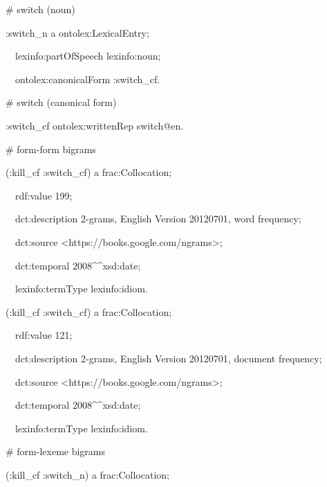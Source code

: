 \documentclass[a4paper]{article}
\newcommand\textstyleSourceText[1]{\textrm{#1}}
\begin{document}
\bigskip

\textstyleSourceText{\# switch (noun)}

\textstyleSourceText{:switch\_n a ontolex:LexicalEntry;}

\textstyleSourceText{\ \ lexinfo:partOfSpeech lexinfo:noun;}

\textstyleSourceText{\ \ ontolex:canonicalForm :switch\_cf.}


\bigskip

\textstyleSourceText{\# switch (canonical form)}

\textstyleSourceText{:switch\_cf ontolex:writtenRep {\textquotedbl}switch{\textquotedbl}@en.}


\bigskip

\textstyleSourceText{\# form-form bigrams}

\textstyleSourceText{(:kill\_cf :switch\_cf) a frac:Collocation;}

\textstyleSourceText{\ \ rdf:value {\textquotedbl}199{\textquotedbl};}

\textstyleSourceText{\ \ dct:description {\textquotedbl}2-grams, English Version 20120701, word frequency{\textquotedbl};}

\textstyleSourceText{\ \ dct:source {\textless}https://books.google.com/ngrams{\textgreater};}

\textstyleSourceText{\ \ dct:temporal {\textquotedbl}2008{\textquotedbl}\^{}\^{}xsd:date;}

\textstyleSourceText{\ \ lexinfo:termType lexinfo:idiom.}


\bigskip

\textstyleSourceText{(:kill\_cf :switch\_cf) a frac:Collocation;}

\textstyleSourceText{\ \ rdf:value {\textquotedbl}121{\textquotedbl};}

\textstyleSourceText{\ \ dct:description {\textquotedbl}2-grams, English Version 20120701, document frequency{\textquotedbl};}

\textstyleSourceText{\ \ dct:source {\textless}https://books.google.com/ngrams{\textgreater};}

\textstyleSourceText{\ \ dct:temporal {\textquotedbl}2008{\textquotedbl}\^{}\^{}xsd:date;}

\textstyleSourceText{\ \ lexinfo:termType lexinfo:idiom.}


\bigskip

\textstyleSourceText{\# form-lexeme bigrams}

\textstyleSourceText{(:kill\_cf :switch\_n) a frac:Collocation;}
\end{document}
